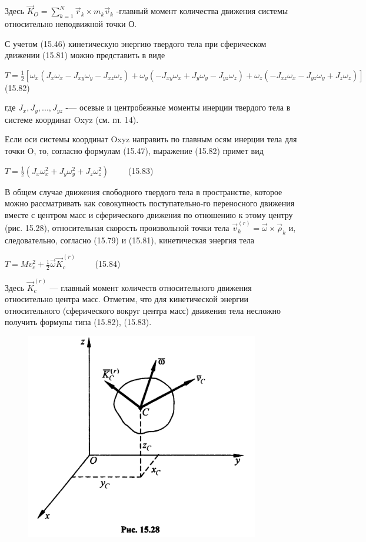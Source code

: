{\begin{center}
    \par Здесь $\vec{K}_O = \sum_{k=1}^N {\vec{r}_k \times m_k \vec{v}_k}$ -главный момент количества движения системы относительно неподвижной точки О.
    \par С учетом (15.46) кинетическую энергию твердого тела при сферическом движении (15.81) можно представить в виде
    \par $ T = \frac{1}{2} [\omega_x (J_x \omega_x - J_{xy} \omega_y - J_{xz} \omega_z) + \omega_y(-J_{xy}\omega_x + J_y \omega_y - J_{yz}\omega_z) + \omega_z (-J_{xz} \omega_x - J_{yz} \omega_y + J_z \omega_z)]  \qquad$ (15.82)
    \par где  $J_x, J_y, ..., J_{yz} $ -— осевые и центробежные моменты инерции твердого тела в системе координат Oxyz  (см. гл. 14).
    \par Если оси системы координат  Oxyz  направить по главным осям инерции тела для точки O, то, согласно формулам (15.47), выражение (15.82) примет вид
    \par $T = \frac{1}{2} (J_x \omega_x^2 + J_y \omega_y^2 + J_z \omega_z^2) \qquad$ (15.83)
    \par В  общем  случае  движения  свободного  твердого  тела  в  пространстве, которое можно рассматривать как совокупность поступательно-го переносного движения вместе с центром масс и сферического движения по отношению к этому центру (рис. 15.28), относительная скорость произвольной точки тела $ \vec{v}_k^{(r)}= {\vec{\omega} \times \vec{\rho}_k}$ и, следовательно, согласно (15.79) и (15.81), кинетическая энергия тела 
    \par $T =  M v_c^2 + \frac{1}{2} \vec{\omega} \vec{K}_c^{(r)} \qquad$ (15.84) 
    \par Здесь  $\vec{K}_c^{(r)}$ — главный момент количеств относительного движения относительно центра масс. Отметим, что для кинетической энергии относительного (сферического вокруг центра масс) движения тела несложно получить формулы типа (15.82), (15.83).
     \begin{figure}[H]
        \centering\includegraphics[scale=0.5]{img/15.28.jpeg} 

\end{figure}
\end{center}}

